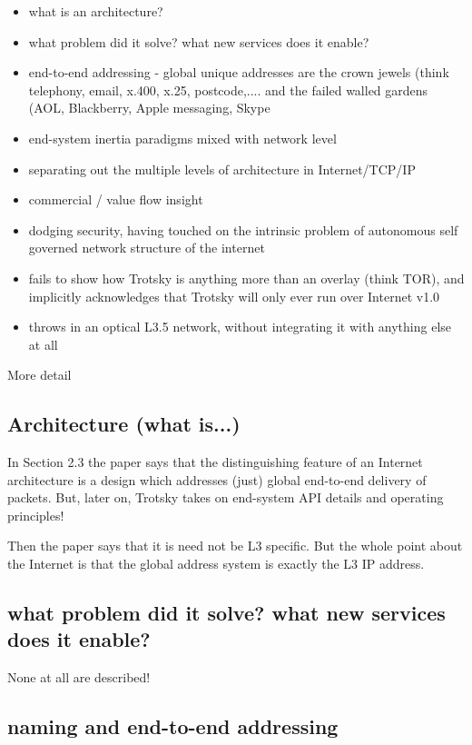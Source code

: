 \begin{itemize}
	\item what is an architecture?
	\item what problem did it solve? what new services does it enable?
	\item end-to-end addressing - global unique addresses are the crown jewels (think telephony, email, x.400, x.25, postcode,.... and the failed walled gardens (AOL, Blackberry, Apple messaging, Skype
	\item end-system inertia paradigms mixed with network level
	\item separating out the multiple levels of architecture in Internet/TCP/IP
	\item commercial / value flow insight
	\item dodging security, having touched on the intrinsic problem of autonomous self governed network structure of the internet
	\item fails to show how Trotsky is anything more than an overlay (think TOR), and implicitly acknowledges that Trotsky will only ever run over Internet v1.0
	\item throws in an optical L3.5 network, without integrating it with anything else at all
\end{itemize}
More detail

\subsection{Architecture (what is...)}

In Section 2.3 the paper says that the distinguishing feature of an Internet architecture is a design which addresses (just) global end-to-end delivery of packets.
But, later on, Trotsky takes on end-system API details and operating principles!

Then the paper says that it is need not be L3 specific.
But the whole point about the Internet is that the global address system is exactly the L3 IP address.

\subsection{what problem did it solve? what new services does it enable?}

None at all are described!

\subsection{naming and end-to-end addressing}

